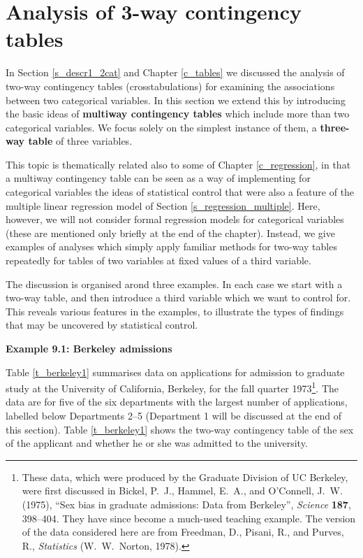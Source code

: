 \chapter{Analysis of 3-way contingency tables}
\label{c_3waytables}

In Section \ref{s_descr1_2cat} and Chapter \ref{c_tables} we discussed
the analysis of two-way contingency tables (crosstabulations) for
examining the associations between two categorical variables. In this
section we extend this by introducing the basic ideas of
\textbf{multiway contingency tables} which include more than two
categorical variables. We focus solely on the simplest instance of them,
a \textbf{three-way table} of three variables.

This topic is thematically related also to some of Chapter
\ref{c_regression}, in that a multiway contingency table can be seen as
a way of implementing for categorical variables
the ideas of statistical control
that were also a feature
of the multiple linear regression model of Section
\ref{s_regression_multiple}. Here, however, we will not consider formal
regression models for categorical variables (these are mentioned only
briefly at the end of the chapter). Instead, we give examples of
analyses which simply apply familiar methods for two-way tables repeatedly
for tables of two variables at fixed values of a third variable.

The discussion is organised arond three examples. In each case we start
with a two-way table, and then introduce a third variable which we want
to control for. This reveals various features in the examples, to
illustrate the types of findings that may be uncovered by statistical
control.

\textbf{Example 9.1: Berkeley admissions}

Table \ref{t_berkeley1} summarises data on applications for admission to
graduate study at the University of California, Berkeley, for the fall
quarter 1973\footnote{These data, which were produced by the Graduate
Division of UC Berkeley, were first discussed in Bickel, P.\ J., Hammel,
E.\ A., and O'Connell, J.\ W. (1975), ``Sex bias in graduate admissions:
Data from Berkeley'', \emph{Science} \textbf{187}, 398--404. They have
since become a much-used teaching example. The version of the data
considered here are from Freedman, D., Pisani, R., and Purves, R.,
\emph{Statistics} (W.\ W.\ Norton, 1978).}. The data are for five of the
six departments with the largest number of applications, labelled below
Departments 2--5 (Department 1 will be discussed at the end of this
section). Table \ref{t_berkeley1} shows the two-way contingency table of
the sex of the applicant and whether he or she was admitted to the
university.


